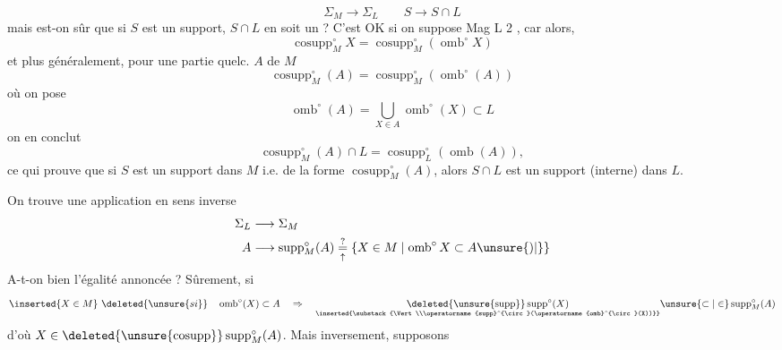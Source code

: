 
\[
\Sigma_M\longrightarrow\Sigma_L\qquad S\longrightarrow S\cap L
\]
mais est-on sûr que si $S$ est un support, $S\cap L$ en soit un ? C'est OK si on suppose Mag L 2  , car alors,
\[
\operatorname{cosupp}^{\circ}_M X=\operatorname{cosupp}^{\circ}_M(\operatorname{omb}^{\circ}X)
\]
et plus généralement, pour une partie quelc. $A$ de $M$
\[
\operatorname{cosupp}^{\circ}_M(A)=\operatorname{cosupp}^{\circ}_M(\operatorname{omb}^{\circ}(A))
\]
où on pose
\[
\operatorname{omb}^{\circ}(A)=\bigcup_{X\in A}\operatorname{omb}^{\circ}(X)\subset L
\]
on en conclut
\[
\operatorname{cosupp}^{\circ}_M(A)\cap L=\operatorname{cosupp}^{\circ}_L(\operatorname{omb}(A)),
\]
 ce qui prouve que si $S$ est un support dans $M$ i.e. de la forme $\operatorname{cosupp}^{\circ}_M(A)$, alors $S\cap L$ est un support (interne) dans $L$.

On trouve une application en sens inverse
\[
\begin{aligned}
\Sigma_L&\longrightarrow\Sigma_M\\
 A&\longrightarrow\operatorname{supp}^{\circ}_M(A)\underset{\uparrow}{\overset{?}{=}}\{X\in M\mid\operatorname{omb}^{\circ}X\subset A\unsure{)|\}}
\end{aligned}
\]
A-t-on bien l'égalité annoncée ? Sûrement, si
\[
\inserted{X\in M}\ \deleted{\unsure{si}}\quad\operatorname{omb}^{\circ}(X)\subset A\quad\Rightarrow\quad
\underset{\inserted{\substack{\Vert\\\operatorname{supp}^{\circ}(\operatorname{omb}^{\circ}(X))}}}{\deleted{\unsure{\operatorname{supp}}}\operatorname{supp}^{\circ}(X)}
\unsure{\subset|\in}\operatorname{supp}^{\circ}_M(A)
\]
d'où $X\in\deleted{\unsure{\operatorname{cosupp}}}\operatorname{supp}^{\circ}_M(A)$. Mais inversement, supposons
